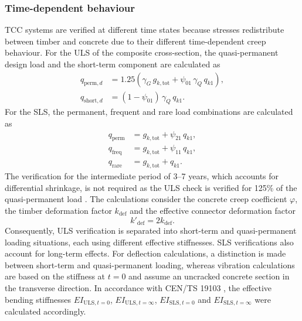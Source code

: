 \subsubsection{Time-dependent behaviour}

TCC systems are verified at different time states because stresses redistribute between timber and concrete due to their different time-dependent creep behaviour. For the ULS of the composite cross-section, the quasi-permanent design load and the short-term component are calculated as
\begin{equation}
\begin{aligned}
q_{\mathrm{perm},d}
&=
1.25
\left(
\gamma_G\, g_{k,\mathrm{tot}}
+
\psi_{01}\,\gamma_Q\, q_{k1}
\right),
\\
q_{\mathrm{short},d}
&=
(1-\psi_{01})
\,\gamma_Q\, q_{k1}.
\end{aligned}
\end{equation}
For the SLS, the permanent, frequent and rare load combinations are calculated as
\begin{equation}
\begin{aligned}
q_{\mathrm{perm}}
&=
g_{k,\mathrm{tot}}
+
\psi_{21}\,q_{k1},
\\
q_{\mathrm{freq}}
&=
g_{k,\mathrm{tot}}
+
\psi_{11}\,q_{k1},
\\
q_{\mathrm{rare}}
&=
g_{k,\mathrm{tot}}
+
q_{k1}.
\end{aligned}
\end{equation}
The verification for the intermediate period of 3--7 years, which accounts for differential shrinkage, is not required as the ULS check is verified for 125\% of the quasi-permanent load \cite{CENTS191032021}. The calculations consider the concrete creep coefficient $\varphi$, the timber deformation factor $k_{\mathrm{def}}$ and the effective connector deformation factor
\begin{equation}
k'_{\mathrm{def}}
=
2k_{\mathrm{def}}.
\end{equation}
Consequently, ULS verification is separated into short-term and quasi-permanent loading situations, each using different effective stiffnesses. SLS verifications also account for long-term effects. For deflection calculations, a distinction is made between short-term and quasi-permanent loading, whereas vibration calculations are based on the stiffness at $t=0$ and assume an uncracked concrete section in the transverse direction. In accordance with CEN/TS 19103 \cite{CENTS191032021}, the effective bending stiffnesses $EI_{\mathrm{ULS},t=0}$, $EI_{\mathrm{ULS},t=\infty}$, $EI_{\mathrm{SLS},t=0}$ and $EI_{\mathrm{SLS},t=\infty}$ were calculated accordingly.

